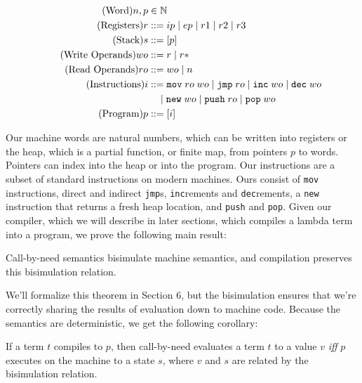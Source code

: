 \begin{align}
  \tag{Word}   n, p &\in \mathbb{N} \\
  \tag{Registers} r &::= ip \; | \; ep \; | \; r1 \; | \; r2 \; | \; r3 \\
  \tag{Stack}     s &::= [p] \\
  \tag{Write Operands}  wo &::= r \; | \; r* \\
  \tag{Read Operands}  ro &::= wo \; | \; n \\
  \tag{Instructions} i &::= \texttt{mov} \; ro \; wo \; 
                       | \; \texttt{jmp} \; ro \; 
                       | \; \texttt{inc} \; wo \;
                       | \; \texttt{dec} \; wo \; \\
  \notag    & \quad \; | \; \texttt{new} \; wo \;
                       | \; \texttt{push} \; ro \; 
                       | \; \texttt{pop} \; wo \\
  \tag{Program}   p &::= [i]
\end{align}

Our machine words are natural numbers, which can be written into registers or
the heap, which is a partial function, or finite map, from pointers $p$ to
words. Pointers can index into the heap or into the program. Our instructions
are a subset of standard instructions on modern machines. Ours consist of
\texttt{mov} instructions, direct and indirect \texttt{jmp}s, \texttt{inc}rements
and \texttt{dec}rements, a \texttt{new} instruction that returns a fresh heap
location, and \texttt{push} and \texttt{pop}.  Given our compiler, which we will
describe in later sections, which compiles a lambda term into a program, we
prove the following main result:

\begin{theorem}
Call-by-need semantics bisimulate machine semantics, and compilation
preserves this bisimulation relation.
\end{theorem}

We'll formalize this theorem in Section 6, but the bisimulation ensures that
we're correctly sharing the results of evaluation down to machine code. Because
the semantics are deterministic, we get the following corollary:   

\begin{corollary}
If a term $t$ compiles to $p$, then call-by-need evaluates a term $t$ to a value
$v$ \emph{iff} $p$ executes on the machine to a state $s$, where $v$ and $s$ are
related by the bisimulation relation.
\end{corollary}

